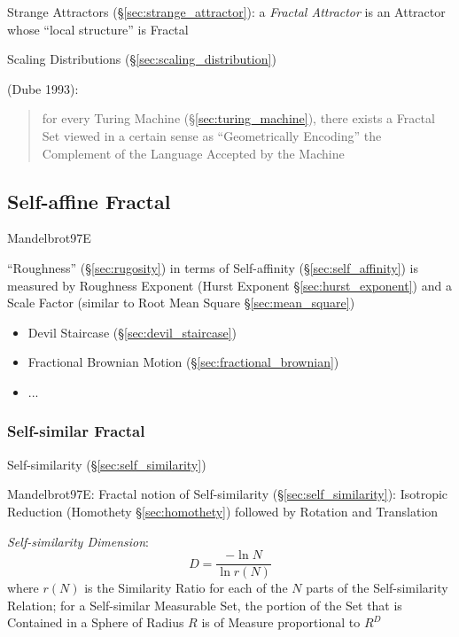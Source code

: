 \fist Strange Attractors (\S\ref{sec:strange_attractor}): a \emph{Fractal
  Attractor} is an Attractor whose ``local structure'' is Fractal

\fist Scaling Distributions (\S\ref{sec:scaling_distribution})

\asterism

(Dube 1993):
\begin{quote}
  for every Turing Machine (\S\ref{sec:turing_machine}), there exists a Fractal
  Set viewed in a certain sense as ``Geometrically Encoding'' the Complement of
  the Language Accepted by the Machine
\end{quote}



\subsection{Self-affine Fractal}\label{sec:selfaffine_fractal}

Mandelbrot97E

``Roughness'' (\S\ref{sec:rugosity}) in terms of Self-affinity
(\S\ref{sec:self_affinity}) is measured by Roughness Exponent (Hurst Exponent
\S\ref{sec:hurst_exponent}) and a Scale Factor (similar to Root Mean Square
\S\ref{sec:mean_square})

\begin{itemize}
  \item Devil Staircase (\S\ref{sec:devil_staircase})
  \item Fractional Brownian Motion (\S\ref{sec:fractional_brownian})
  \item ...
\end{itemize}



\subsubsection{Self-similar Fractal}\label{sec:selfsimilar_fractal}

Self-similarity (\S\ref{sec:self_similarity})

Mandelbrot97E: Fractal notion of Self-similarity (\S\ref{sec:self_similarity}):
Isotropic Reduction (Homothety \S\ref{sec:homothety}) followed by Rotation and
Translation

\emph{Self-similarity Dimension}:
\[
  D = \frac{-\ln N}{\ln r(N)}
\]
where $r(N)$ is the Similarity Ratio for each of the $N$ parts of the
Self-similarity Relation; for a Self-similar Measurable Set, the portion of the
Set that is Contained in a Sphere of Radius $R$ is of Measure proportional to
$R^D$

